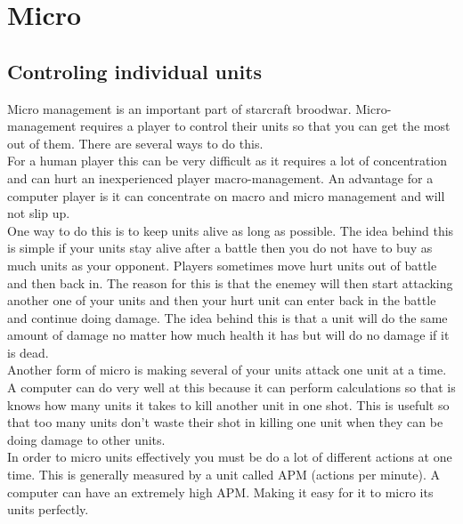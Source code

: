 \section{Micro}
\subsection{Controling individual units}
	Micro management is an important part of starcraft broodwar. Micro-management requires a player to control their units so that you can get the most out of them. There are several ways to do this.\\
	 For a human player this can be very difficult as it requires a lot of concentration and can hurt an inexperienced player macro-management. An advantage for a computer player is it can concentrate on macro and micro management and will not slip up.\\
One way to do this is to keep units alive as long as possible. The idea behind this is simple if your units stay alive after a battle then you do not have to buy as much units as your opponent. Players sometimes move hurt units out of battle and then back in. The reason for this is that the enemey will then start attacking another one of your units and then your hurt unit can enter back in the battle and continue doing damage. The idea behind this is that a unit will do the same amount of damage no matter how much health it has but will do no damage if it is dead.\\
	Another form of micro is making several of your units attack one unit at a time. A computer can do very well at this because it can perform calculations so that is knows how many units it takes to kill another unit in one shot. This is usefult so that too many units don't waste their shot in killing one unit when they can be doing damage to other units.\\
	In order to micro units effectively you must be do a lot of different actions at one time. This is generally measured by a unit called APM (actions per minute). A computer can have an extremely high APM. Making it easy for it to micro its units perfectly.

